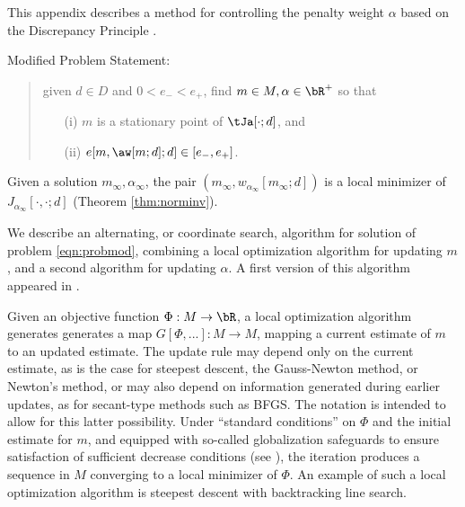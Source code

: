


This appendix describes a method for controlling the penalty
weight $\alpha$ based on the Discrepancy Principle
\cite[]{EnglHankeNeubauer,FuSymes2017discrepancy}.

Modified Problem Statement:
\begin{quote}
  \label{eqn:probmod}
  given $d \in D$ and $0 < e_- < e_+$,  find  $m \in M, \alpha \in \bR^+$ so that
  \begin{itemize}
  \item[(i) ]$m$ is a stationary point of $\tJa[\cdot;d]$, and
  \item[(ii) ]$e[m,\aw[m;d];d] \in [e_-,e_+]$.
  \end{itemize}
\end{quote}

 Given a solution $m_{\infty}, \alpha_{\infty}$, the pair
$(m_{\infty},w_{\alpha_{\infty}}[m_{\infty};d])$ is a local minimizer
of $J_{\alpha_{\infty}}[\cdot,\cdot;d]$ (Theorem \ref{thm:norminv}).

We describe an alternating, or coordinate search, algorithm for
solution of problem \ref{eqn:probmod}, combining a local optimization
algorithm for updating $m$, and a second algorithm for updating
$\alpha$. A first version of this algorithm appeared in \cite{FuSymes2017discrepancy}.

Given an
objective function $\Phi: M \rightarrow \bR$, a local optimization algorithm generates 
generates a map $G[\Phi,...]: M \rightarrow M$, mapping a current estimate
of $m$ to an updated estimate. The update rule may depend only on the
current estimate, as is the case for steepest descent, the
Gauss-Newton method, or Newton's method, or may also depend on
information generated during earlier updates, as for secant-type
methods such as BFGS. The notation is intended to allow for this
latter possibility. Under ``standard conditions'' on $\Phi$ and the initial estimate for
$m$, and equipped with so-called globalization safeguards to ensure
satisfaction of sufficient decrease conditions
(see \cite{NocedalWright}), the iteration produces a sequence in $M$
converging to a local minimizer of $\Phi$. An example of such a local
optimization algorithm is steepest descent with backtracking line
search.

